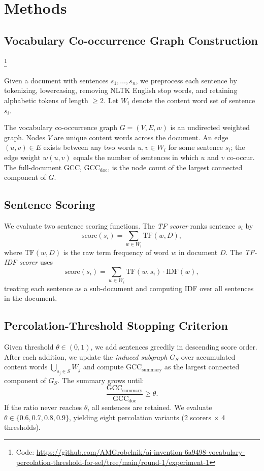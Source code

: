 \documentclass[11pt,letterpaper]{article}
\begin{document}
\section{Methods}
\label{sec:methods}

\subsection{Vocabulary Co-occurrence Graph Construction}%
\footnote{Code: \url{https://github.com/AMGrobelnik/ai-invention-6a9498-vocabulary-percolation-threshold-for-sel/tree/main/round-1/experiment-1}}

Given a document with sentences $s_1, \ldots, s_n$, we preprocess each sentence by
tokenizing, lowercasing, removing NLTK English stop words, and retaining alphabetic
tokens of length $\ge 2$. Let $W_i$ denote the content word set of sentence $s_i$.

The vocabulary co-occurrence graph $G = (V, E, w)$ is an undirected weighted graph.
Nodes $V$ are unique content words across the document. An edge $(u, v) \in E$ exists
between any two words $u, v \in W_i$ for some sentence $s_i$; the edge weight $w(u,v)$
equals the number of sentences in which $u$ and $v$ co-occur. The full-document GCC,
$\text{GCC}_{\text{doc}}$, is the node count of the largest connected component of $G$.

\subsection{Sentence Scoring}

We evaluate two sentence scoring functions. The \emph{TF scorer} ranks sentence $s_i$
by
\[
  \text{score}(s_i) = \sum_{w \in W_i} \text{TF}(w, D),
\]
where $\text{TF}(w,D)$ is the raw term frequency of word $w$ in document $D$. The
\emph{TF-IDF scorer} uses
\[
  \text{score}(s_i) = \sum_{w \in W_i} \text{TF}(w, s_i) \cdot \text{IDF}(w),
\]
treating each sentence as a sub-document and computing IDF over all sentences in the
document.

\subsection{Percolation-Threshold Stopping Criterion}

Given threshold $\theta \in (0,1)$, we add sentences greedily in descending score order.
After each addition, we update the \emph{induced subgraph} $G_S$ over accumulated
content words $\bigcup_{s_j \in S} W_j$ and compute $\text{GCC}_{\text{summary}}$ as
the largest connected component of $G_S$. The summary grows until:
\[
  \frac{\text{GCC}_{\text{summary}}}{\text{GCC}_{\text{doc}}} \geq \theta.
\]
If the ratio never reaches $\theta$, all sentences are retained. We evaluate $\theta \in
\{0.6, 0.7, 0.8, 0.9\}$, yielding eight percolation variants (2 scorers $\times$ 4
thresholds).
\end{document}

